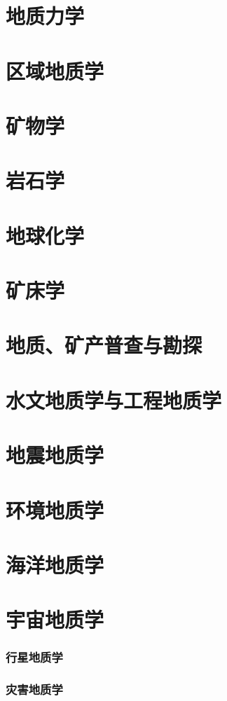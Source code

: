 \documentclass[UTF8]{../NatureUniverse}
\begin{document}
\section{地质力学}
\section{区域地质学}
\section{矿物学}
\section{岩石学}
\section{地球化学}
\section{矿床学}
\section{地质、矿产普查与勘探}
\section{水文地质学与工程地质学}
\section{地震地质学}
\section{环境地质学}
\section{海洋地质学}
\section{宇宙地质学}
    \subsubsection{行星地质学}
    \subsubsection{灾害地质学}
\end{document}
